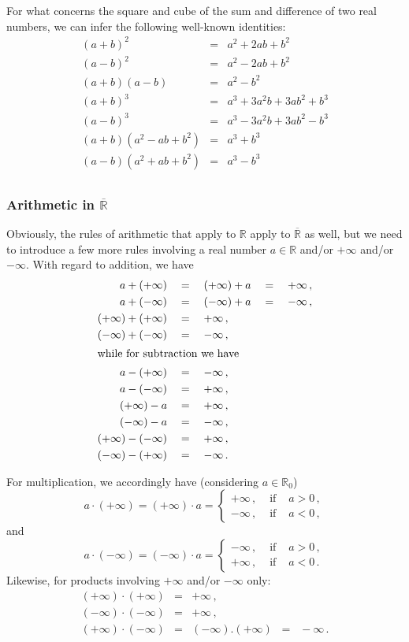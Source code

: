 For what concerns the square and cube of the sum and difference of two real numbers, we can infer the following well-known identities:
\allowdisplaybreaks
\begin{eqnarray*}
	(a+b)^2&=&a^2+2ab+b^2\\ 
	(a-b)^2&=&a^2-2ab+b^2\\
	(a+b)(a-b)&=&a^2-b^2\\
	(a+b)^3&=&a^3+3a^2b+3ab^2+b^3\\
	(a-b)^3&=&a^3-3a^2b+3ab^2-b^3\\
	(a+b)(a^2-ab+b^2)&=&a^3+b^3\\
	(a-b)(a^2+ab+b^2)&=&a^3-b^3\\
\end{eqnarray*}

\subsubsection{Arithmetic in $\overline{\mathbb{R}}$}
Obviously, the rules of arithmetic that apply to $\mathbb{R}$ apply to $\overline{\mathbb{R}}$ as well, but we need to introduce a few more rules involving a real number $a\in\mathbb{R}$ and/or $+\infty$ and/or $-\infty$. With regard to addition, we have
\begin{align*}
a+(+\infty) \quad&=\quad (+\infty)+ a\quad=\quad+ \infty\,,\\ 
a+(-\infty)\quad&=\quad(-\infty) + a\quad=\quad- \infty\,,\\
(+\infty)+(+\infty)\quad&=\quad+\infty\,,\\
(-\infty)+(-\infty)\quad&=\quad-\infty\,,\\
\intertext{while for subtraction we have}
a-(+\infty) \quad&=\quad - \infty\,,\\
a-(-\infty) \quad&=\quad + \infty\,,\\
(+\infty) - a \quad&=\quad + \infty\,,\\
(-\infty) - a \quad&=\quad - \infty\,,\\
(+\infty)-(-\infty) \quad&=\quad +\infty\,,\\
(-\infty)-(+\infty) \quad&=\quad -\infty\,.
\end{align*}

For multiplication, we accordingly have (considering $a\in\mathbb{R}_0$)
$$
a\cdot(+\infty)=(+\infty)\cdot a=\left\{\begin{array}{lcl}
+\infty\,,&\mbox{ if }&a>0\,,\\
-\infty\,,&\mbox{ if }&a<0\,,\end{array}\right.
$$
and 
$$
a\cdot(-\infty)=(-\infty)\cdot a=\left\{\begin{array}{lcl}
-\infty\,,&\mbox{ if }&a>0\,,\\
+\infty\,,&\mbox{ if }&a<0\,.\end{array}\right.
$$
Likewise, for products involving $+\infty$ and/or $-\infty$ only:
\begin{eqnarray*}
	(+\infty)\cdot(+\infty)&=&+\infty\,,\\
	(-\infty)\cdot(-\infty)&=&+\infty\,,\\
	(+\infty)\cdot(-\infty)&=&(-\infty).(+\infty)\; \; =\; \; -\infty\,.
\end{eqnarray*}

